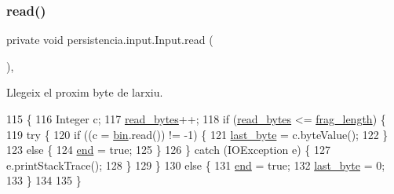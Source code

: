 \subsubsection{\texorpdfstring{read()}{read()}}
{\footnotesize\ttfamily private void persistencia.\+input.\+Input.\+read (\begin{DoxyParamCaption}{ }\end{DoxyParamCaption})\hspace{0.3cm}{\ttfamily [inline]}, {\ttfamily [private]}}



Llegeix el proxim byte de l\textquotesingle{}arxiu. 


\begin{DoxyCode}
115                         \{
116         Integer c;
117         \hyperlink{classpersistencia_1_1input_1_1Input_ace2c934234f82fb07ae169b50f71cd32}{read\_bytes}++;
118         \textcolor{keywordflow}{if} (\hyperlink{classpersistencia_1_1input_1_1Input_ace2c934234f82fb07ae169b50f71cd32}{read\_bytes} <= \hyperlink{classpersistencia_1_1input_1_1Input_adae91120899054fe5200d5e307840042}{frag\_length}) \{
119             \textcolor{keywordflow}{try} \{
120                 \textcolor{keywordflow}{if} ((c = \hyperlink{classpersistencia_1_1input_1_1Input_aa4b622d30a090256ce05c5082cdb0791}{bin}.read()) != -1) \{
121                     \hyperlink{classpersistencia_1_1input_1_1Input_a45d4bdcdb96823fc8ffe5c1a430727f2}{last\_byte} = c.byteValue();
122                 \}
123                 \textcolor{keywordflow}{else} \{
124                     \hyperlink{classpersistencia_1_1input_1_1Input_aa986cd4af0178e1a80f551dcd8936125}{end} = \textcolor{keyword}{true};
125                 \}
126             \} \textcolor{keywordflow}{catch} (IOException e) \{
127                 e.printStackTrace();
128             \}
129         \}
130         \textcolor{keywordflow}{else} \{
131             \hyperlink{classpersistencia_1_1input_1_1Input_aa986cd4af0178e1a80f551dcd8936125}{end} = \textcolor{keyword}{true};
132             \hyperlink{classpersistencia_1_1input_1_1Input_a45d4bdcdb96823fc8ffe5c1a430727f2}{last\_byte} = 0;
133         \}
134 
135     \}
\end{DoxyCode}
\mbox{\label{classpersistencia_1_1input_1_1Input_a619abf26ddafb7a1bde420622d3c7aa5}} 
